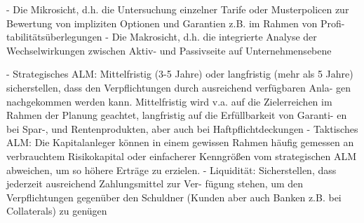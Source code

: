 - Die Mikrosicht, d.h. die Untersuchung einzelner Tarife oder Musterpolicen zur
Bewertung von impliziten Optionen und Garantien z.B. im Rahmen von Profi-
tabilitätsüberlegungen
- Die Makrosicht, d.h. die integrierte Analyse der Wechselwirkungen zwischen
Aktiv- und Passivseite auf Unternehmensebene

- Strategisches ALM: Mittelfristig (3-5 Jahre) oder langfristig (mehr als 5 Jahre)
sicherstellen, dass den Verpflichtungen durch ausreichend verfügbaren Anla-
gen nachgekommen werden kann. Mittelfristig wird v.a. auf die Zielerreichen
im Rahmen der Planung geachtet, langfristig auf die Erfüllbarkeit von Garanti-
en bei Spar-, und Rentenprodukten, aber auch bei Haftpflichtdeckungen
- Taktisches ALM: Die Kapitalanleger können in einem gewissen Rahmen häufig gemessen an verbrauchtem Risikokapital oder einfacherer Kenngrößen vom strategischen ALM abweichen, um so höhere Erträge zu erzielen.
- Liquidität: Sicherstellen, dass jederzeit ausreichend Zahlungsmittel zur Ver-
fügung stehen, um den Verpflichtungen gegenüber den Schuldner (Kunden
aber auch Banken z.B. bei Collaterals) zu genügen
